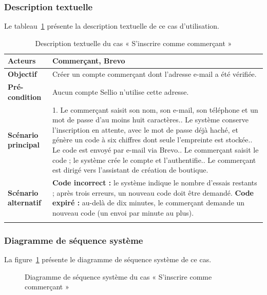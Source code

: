 \subsubsection{Description textuelle}
Le tableau~\ref{tab:uc-inscription} présente la description textuelle de ce cas d'utilisation.
\renewcommand{\arraystretch}{1.5}
\begin{longtable}{|p{4cm}|p{11cm}|}
\hline
\textbf{Acteurs} & Commerçant, Brevo \\
\hline
\textbf{Objectif} & Créer un compte commerçant dont l'adresse e-mail a été vérifiée. \\
\hline
\textbf{Pré-condition} & Aucun compte Sellio n'utilise cette adresse. \\
\hline
\textbf{Scénario principal} &
1. Le commerçant saisit son nom, son e-mail, son téléphone et un mot de passe d'au moins huit caractères.\newline
2. Le système conserve l'inscription en attente, avec le mot de passe déjà haché, et génère un code à six chiffres dont seule l'empreinte est stockée.\newline
3. Le code est envoyé par e-mail via Brevo.\newline
4. Le commerçant saisit le code ; le système crée le compte et l'authentifie.\newline
5. Le commerçant est dirigé vers l'assistant de création de boutique. \\
\hline
\textbf{Scénario alternatif} &
\textbf{Code incorrect :} le système indique le nombre d'essais restants ; après trois erreurs, un nouveau code doit être demandé.\newline
\textbf{Code expiré :} au-delà de dix minutes, le commerçant demande un nouveau code (un envoi par minute au plus). \\
\hline
\caption{Description textuelle du cas « S'inscrire comme commerçant »}
\label{tab:uc-inscription}
\end{longtable}

\subsubsection{Diagramme de séquence système}
La figure~\ref{fig:dss-inscription} présente le diagramme de séquence système de ce cas.
\begin{figure}[H]
    \centering
    \caption{Diagramme de séquence système du cas « S'inscrire comme commerçant »}
    \label{fig:dss-inscription}
\end{figure}

